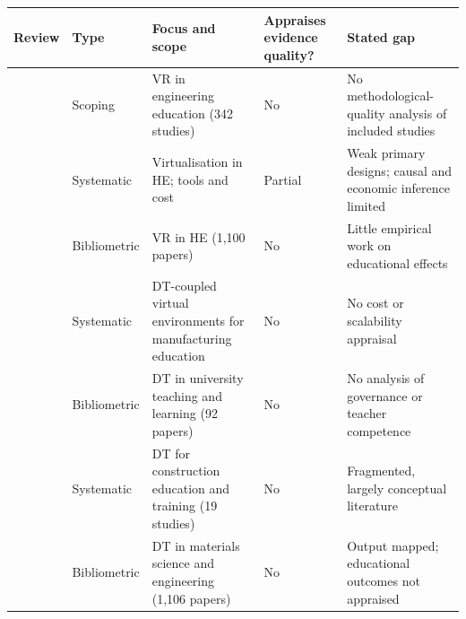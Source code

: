 {\def\LTcaptype{none} %
\begin{longtable}[]{@{}
  >{\raggedright\arraybackslash}p{}
  >{\raggedright\arraybackslash}p{}
  >{\raggedright\arraybackslash}p{}
  >{\raggedright\arraybackslash}p{}
  >{\raggedright\arraybackslash}p{}@{}}
\toprule\noalign{}
\begin{minipage}[b]{\linewidth}\raggedright
Review
\end{minipage} & \begin{minipage}[b]{\linewidth}\raggedright
Type
\end{minipage} & \begin{minipage}[b]{\linewidth}\raggedright
Focus and scope
\end{minipage} & \begin{minipage}[b]{\linewidth}\raggedright
Appraises evidence quality?
\end{minipage} & \begin{minipage}[b]{\linewidth}\raggedright
Stated gap
\end{minipage} \\
\midrule\noalign{}
\endhead
\bottomrule\noalign{}
\endlastfoot
\citep{lampropoulos_virtual_2025} & Scoping & VR in engineering education (342 studies) & No & No methodological-quality analysis of included studies \\
\citep{tokhayeva_virtualisation_2026} & Systematic & Virtualisation in HE; tools and cost & Partial & Weak primary designs; causal and economic inference limited \\
\citep{jiang_state_2026} & Bibliometric & VR in HE (1,100 papers) & No & Little empirical work on educational effects \\
\citep{kumar_karanam_systematic_2025} & Systematic & DT-coupled virtual environments for manufacturing education & No & No cost or scalability appraisal \\
\citep{chamorro-atalaya_use_2024} & Bibliometric & DT in university teaching and learning (92 papers) & No & No analysis of governance or teacher competence \\
\citep{omrany_digital_2026} & Systematic & DT for construction education and training (19 studies) & No & Fragmented, largely conceptual literature \\
\citep{vergara_decade_2025} & Bibliometric & DT in materials science and engineering (1,106 papers) & No & Output mapped; educational outcomes not appraised \\

\end{longtable}}

